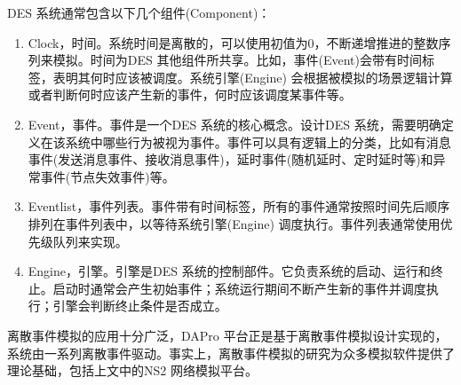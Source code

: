     DES 系统通常包含以下几个组件(Component)：
    \begin{enumerate}
    \item Clock，时间。系统时间是离散的，可以使用初值为0，不断递增推进的整数序列来模拟。时间为DES 其他组件所共享。比如，事件(Event)会带有时间标签，表明其何时应该被调度。系统引擎(Engine) 会根据被模拟的场景逻辑计算或者判断何时应该产生新的事件，何时应该调度某事件等。
    \item Event，事件。事件是一个DES 系统的核心概念。设计DES 系统，需要明确定义在该系统中哪些行为被视为事件。事件可以具有逻辑上的分类，比如有消息事件(发送消息事件、接收消息事件)，延时事件(随机延时、定时延时等)和异常事件(节点失效事件)等。
    \item Eventlist，事件列表。事件带有时间标签，所有的事件通常按照时间先后顺序排列在事件列表中，以等待系统引擎(Engine) 调度执行。事件列表通常使用优先级队列来实现。
    \item Engine，引擎。引擎是DES 系统的控制部件。它负责系统的启动、运行和终止。启动时通常会产生初始事件；系统运行期间不断产生新的事件并调度执行；引擎会判断终止条件是否成立。
    \end{enumerate}

    离散事件模拟的应用十分广泛，DAPro 平台正是基于离散事件模拟设计实现的，系统由一系列离散事件驱动。事实上，离散事件模拟的研究为众多模拟软件提供了理论基础，包括上文中的NS2 网络模拟平台。
